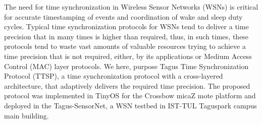 The need for time synchronization in Wireless Sensor Networks  (WSNs) is critical for accurate timestamping of events and coordination of wake and sleep duty cycles.
Typical time synchronization protocols for WSNs tend to deliver a time precision that in many times is higher than required, thus, in such times, these protocols tend to waste vast amounts of valuable resources trying to achieve a time precision that is not required, either, by its applications or Medium Access Control (MAC) layer protocols.
We here, purpose Tagus Time Synchronization Protocol (TTSP), a time synchronization protocol with a cross-layered architecture, that adaptively delivers the required time precision.
The proposed protocol was implemented in TinyOS for the Crossbow micaZ mote platform and deployed in the Tagus-SensorNet, a WSN testbed in IST-TUL Taguspark campus main building.